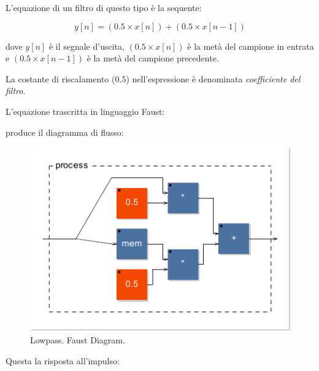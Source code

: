 L'equazione di un filtro di questo tipo è la sequente:

\begin{equation}
  \label{lowpass}
  y[n] = (0.5 \times x[n]) + (0.5 \times x[n-1])
\end{equation}

dove $y[n]$ è il segnale d'uscita, $(0.5 \times x[n])$ è la metà del campione in
entrata e $(0.5 \times x[n-1])$ è la metà del campione precedente.

La costante di riscalamento ($0.5$) nell'espressione è denominata \emph{coefficiente
del filtro}.

L'equazione trascritta in linguaggio Faust:



produce il diagramma di flusso:

\begin{figure}[ht]
  \centering
  \includegraphics[]{CAPITOLI/0500/CODES/lowpass-svg/process}
  \caption[]{Lowpass. Faust Diagram.}
  \label{fdlowpass}
\end{figure}

Questa la risposta all'impulso:



\clearpage

